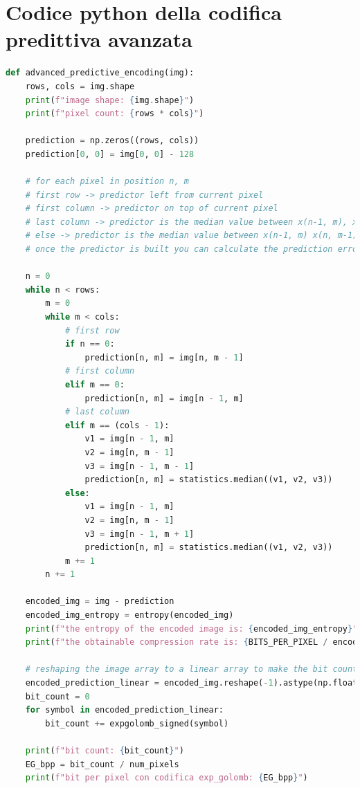 \documentclass{article}
\begin{document}
\newpage 
\section{Codice python della codifica predittiva avanzata}

\begin{lstlisting}[language=python]
def advanced_predictive_encoding(img):
    rows, cols = img.shape
    print(f"image shape: {img.shape}")
    print(f"pixel count: {rows * cols}")

    prediction = np.zeros((rows, cols))
    prediction[0, 0] = img[0, 0] - 128

    # for each pixel in position n, m
    # first row -> predictor left from current pixel
    # first column -> predictor on top of current pixel
    # last column -> predictor is the median value between x(n-1, m), x(n,m-1) and x(n-1, m-1)
    # else -> predictor is the median value between x(n-1, m) x(n, m-1), x(n-1, m+1)
    # once the predictor is built you can calculate the prediction error y = x-p (it's an image)

    n = 0
    while n < rows:
        m = 0
        while m < cols:
            # first row
            if n == 0:
                prediction[n, m] = img[n, m - 1]
            # first column
            elif m == 0:
                prediction[n, m] = img[n - 1, m]
            # last column
            elif m == (cols - 1):
                v1 = img[n - 1, m]
                v2 = img[n, m - 1]
                v3 = img[n - 1, m - 1]
                prediction[n, m] = statistics.median((v1, v2, v3))
            else:
                v1 = img[n - 1, m]
                v2 = img[n, m - 1]
                v3 = img[n - 1, m + 1]
                prediction[n, m] = statistics.median((v1, v2, v3))
            m += 1
        n += 1

    encoded_img = img - prediction
    encoded_img_entropy = entropy(encoded_img)
    print(f"the entropy of the encoded image is: {encoded_img_entropy}")
    print(f"the obtainable compression rate is: {BITS_PER_PIXEL / encoded_img_entropy}")

    # reshaping the image array to a linear array to make the bit count easier
    encoded_prediction_linear = encoded_img.reshape(-1).astype(np.float64)
    bit_count = 0
    for symbol in encoded_prediction_linear:
        bit_count += expgolomb_signed(symbol)

    print(f"bit count: {bit_count}")
    EG_bpp = bit_count / num_pixels
    print(f"bit per pixel con codifica exp_golomb: {EG_bpp}")
\end{lstlisting}
\end{document}
